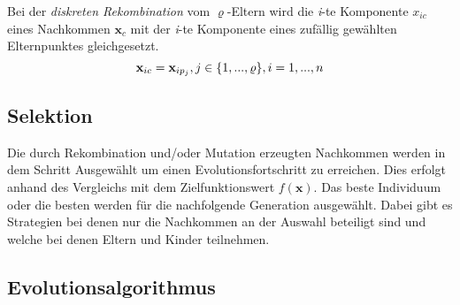 Bei der \textit{diskreten Rekombination} vom $\varrho$-Eltern wird die \textit{i}-te Komponente $x_{ic}$ eines Nachkommen $\mathbf{x}_c$ mit der \textit{i}-te Komponente eines zufällig gewählten Elternpunktes gleichgesetzt.
%
\begin{equation}
\mathbf{x}_{ic} = \mathbf{x}_{ip_j},\\ j\in\{1,...,\varrho\},\\i=1,...,n
\end{equation} 
%
\subsection[Selektion]{Selektion}
Die durch Rekombination und/oder Mutation erzeugten Nachkommen werden in dem Schritt Ausgewählt um einen Evolutionsfortschritt zu erreichen. Dies erfolgt anhand des Vergleichs mit dem Zielfunktionswert $f(\mathbf{x})$. Das beste Individuum oder die besten werden für die nachfolgende Generation ausgewählt. Dabei gibt es Strategien bei denen nur die Nachkommen an der Auswahl beteiligt sind und welche bei denen Eltern und Kinder teilnehmen.

\subsection{Evolutionsalgorithmus}
%


\label{sec:Problems}

